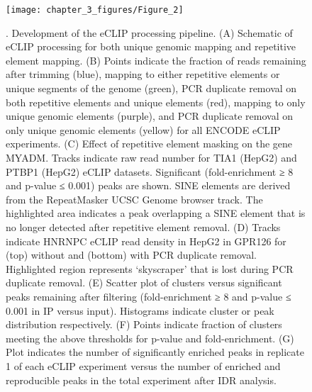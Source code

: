\begin{figure}[ht]
  \centering
  \texttt{[image: chapter\_3\_figures/Figure\_2]}
  \caption[Figure 2]{. Development of the eCLIP processing pipeline. (A) Schematic of eCLIP processing for both unique genomic mapping and repetitive element mapping. (B) Points indicate the fraction of reads remaining after trimming (blue), mapping to either repetitive elements or unique segments of the genome (green), PCR duplicate removal on both repetitive elements and unique elements (red), mapping to only unique genomic elements (purple), and PCR duplicate removal on only unique genomic elements (yellow) for all ENCODE eCLIP experiments. (C) Effect of repetitive element masking on the gene MYADM. Tracks indicate raw read number for TIA1 (HepG2) and PTBP1 (HepG2) eCLIP datasets. Significant (fold-enrichment ≥ 8 and p-value ≤ 0.001) peaks are shown. SINE elements are derived from the RepeatMasker UCSC Genome browser track. The highlighted area indicates a peak overlapping a SINE element that is no longer detected after repetitive element removal. (D) Tracks indicate HNRNPC eCLIP read density in HepG2 in GPR126 for (top) without and (bottom) with PCR duplicate removal. Highlighted region represents ‘skyscraper’ that is lost during PCR duplicate removal. (E) Scatter plot of clusters versus significant peaks remaining after filtering (fold-enrichment ≥ 8 and p-value ≤ 0.001 in IP versus input). Histograms indicate cluster or peak distribution respectively. (F) Points indicate fraction of clusters meeting the above thresholds for p-value and fold-enrichment. (G) Plot indicates the number of significantly enriched peaks in replicate 1 of each eCLIP experiment versus the number of enriched and reproducible peaks in the total experiment after IDR analysis.}
  \label{fig:Figure_2}
\end{figure}

